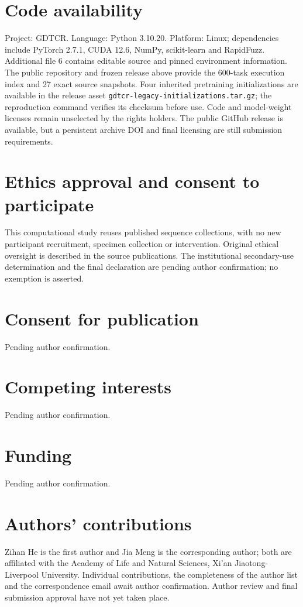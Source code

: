 \documentclass[12pt]{article}
\begin{document}
\section*{Code availability}
Project: GDTCR. Language: Python 3.10.20. Platform: Linux; dependencies include
PyTorch 2.7.1, CUDA 12.6, NumPy, scikit-learn and RapidFuzz. Additional file 6
contains editable source and pinned environment information. The public
repository and frozen release above provide the 600-task execution index and
27 exact source snapshots. Four inherited pretraining initializations are
available in the release asset \texttt{gdtcr-legacy-initializations.tar.gz};
the reproduction command verifies its checksum before use. Code and model-weight
licenses remain unselected by the rights holders. The public GitHub release
is available, but a persistent archive DOI and final licensing are still
submission requirements.

\section*{Ethics approval and consent to participate}
This computational study reuses published sequence collections, with no new
participant recruitment, specimen collection or intervention. Original ethical
oversight is described in the source publications. The institutional
secondary-use determination and the final declaration are pending author
confirmation; no exemption is asserted.

\section*{Consent for publication}
Pending author confirmation.

\section*{Competing interests}
Pending author confirmation.

\section*{Funding}
Pending author confirmation.

\section*{Authors' contributions}
Zihan He is the first author and Jia Meng is the corresponding author; both
are affiliated with the Academy of Life and Natural Sciences, Xi'an
Jiaotong-Liverpool University. Individual contributions, the completeness of
the author list and the correspondence email await author confirmation.
Author review and final submission approval have not yet taken place.
\end{document}
